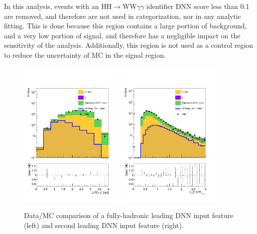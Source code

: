 In this analysis, events with an HH$\rightarrow$WW$\gamma\gamma$ identifier DNN score less than 0.1 
are removed, and therefore are not used in categorization, nor in any analytic fitting. This is done because this region contains a large portion of background, and a very low portion of signal, and therefore has a negligible impact on the sensitivity of the analysis. Additionally,
this region is not used as a control region to reduce the uncertainty of MC in the signal region.


\begin{figure}[!htbp]
  \centering
  \includegraphics[width=0.45\textwidth]{Images/DataMC/DataMC_New_DR_gg_SB_log.pdf}%
  \includegraphics[width=0.45\textwidth]{Images/DataMC/DataMC_Scaled_Leading_Photon_pt_SB_log.pdf}%
  \caption{Data/MC comparison of a fully-hadronic leading DNN input feature (left) and second leading DNN input feature (right).}
\label{fig:FH_DataMC_1}
\end{figure}

